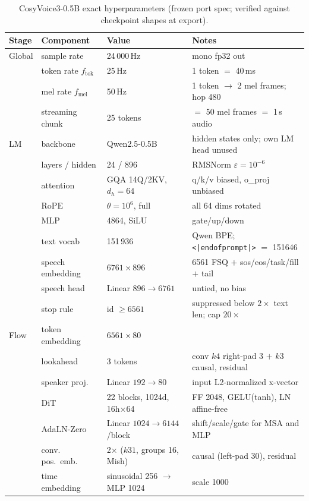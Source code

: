 \documentclass[11pt,a4paper]{article}
\newcommand{\ftok}{\ensuremath{f_{\mathrm{tok}}}}   %
\newcommand{\fmel}{\ensuremath{f_{\mathrm{mel}}}}   %
\newcommand{\code}[1]{\texttt{#1}}
\begin{document}
\begin{table}[htbp]
\centering
\caption{CosyVoice3-0.5B exact hyperparameters (frozen port spec; verified against
checkpoint shapes at export).}
\label{tab:cosy-hparams}
\small
\begin{tabular}{@{}llll@{}}
\toprule
\textbf{Stage} & \textbf{Component} & \textbf{Value} & \textbf{Notes} \\
\midrule
Global & sample rate & 24\,000\,Hz & mono fp32 out \\
 & token rate $\ftok$ & 25\,Hz & 1 token $=$ 40\,ms \\
 & mel rate $\fmel$ & 50\,Hz & 1 token $\to$ 2 mel frames; hop 480 \\
 & streaming chunk & 25 tokens & $=$ 50 mel frames $=$ 1\,s audio \\
\midrule
LM & backbone & Qwen2.5-0.5B & hidden states only; own LM head unused \\
 & layers / hidden & 24 / 896 & RMSNorm $\varepsilon{=}10^{-6}$ \\
 & attention & GQA 14Q/2KV, $d_h{=}64$ & q/k/v biased, o\_proj unbiased \\
 & RoPE & $\theta = 10^{6}$, full & all 64 dims rotated \\
 & MLP & 4864, SiLU & gate/up/down \\
 & text vocab & 151\,936 & Qwen BPE; \code{<|endofprompt|>} $=$ 151646 \\
 & speech embedding & $6761 \times 896$ & 6561 FSQ $+$ sos/eos/task/fill $+$ tail \\
 & speech head & Linear $896 \to 6761$ & untied, no bias \\
 & stop rule & id $\ge 6561$ & suppressed below $2\times$ text len; cap $20\times$ \\
\midrule
Flow & token embedding & $6561 \times 80$ & \\
 & lookahead & 3 tokens & conv $k4$ right-pad 3 $+$ $k3$ causal, residual \\
 & speaker proj. & Linear $192 \to 80$ & input L2-normalized x-vector \\
 & DiT & 22 blocks, 1024d, 16h$\times$64 & FF 2048, GELU(tanh), LN affine-free \\
 & AdaLN-Zero & Linear $1024 \to 6144$/block & shift/scale/gate for MSA and MLP \\
 & conv. pos.\ emb. & 2$\times$ ($k31$, groups 16, Mish) & causal (left-pad 30), residual \\
 & time embedding & sinusoidal 256 $\to$ MLP 1024 & scale 1000 \\

\end{tabular}
\end{table}
\end{document}
